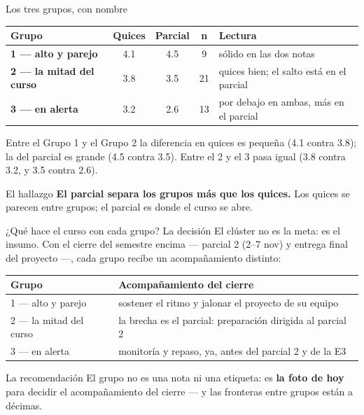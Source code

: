 \documentclass{beamer}
\begin{document}
\begin{frame}{Los tres grupos, con nombre}
\small
\begin{center}
\footnotesize
\setlength{\tabcolsep}{4pt}
\renewcommand{\arraystretch}{1.1}
\begin{tabular}{@{}l c c c l@{}}
\toprule
\textbf{Grupo} & \textbf{Quices} & \textbf{Parcial} & \textbf{n} & \textbf{Lectura} \\
\midrule
\textbf{1 --- alto y parejo} & 4.1 & 4.5 & 9 & sólido en las dos notas \\
\textbf{2 --- la mitad del curso} & 3.8 & 3.5 & 21 & quices bien; el salto está en el parcial \\
\textbf{3 --- en alerta} & 3.2 & 2.6 & 13 & por debajo en ambas, más en el parcial \\
\bottomrule
\end{tabular}
\end{center}

\vspace{0.2cm}
Entre el Grupo 1 y el Grupo 2 la diferencia en quices es pequeña (4.1 contra 3.8); la del parcial es grande (4.5 contra 3.5). Entre el 2 y el 3 pasa igual (3.8 contra 3.2, y 3.5 contra 2.6).

\vspace{0.1cm}
\begin{alertblock}{El hallazgo}
\textbf{El parcial separa los grupos más que los quices.} Los quices se parecen entre grupos; el parcial es donde el curso se abre.
\end{alertblock}
\end{frame}

\begin{frame}{¿Qué hace el curso con cada grupo? La decisión}
\small
El clúster no es la meta: es el insumo. Con el cierre del semestre encima --- parcial 2 (2--7 nov) y entrega final del proyecto ---, cada grupo recibe un acompañamiento distinto:

\vspace{0.15cm}
\begin{center}
\footnotesize
\setlength{\tabcolsep}{4pt}
\renewcommand{\arraystretch}{1.15}
\begin{tabular}{@{}l l@{}}
\toprule
\textbf{Grupo} & \textbf{Acompañamiento del cierre} \\
\midrule
1 --- alto y parejo & sostener el ritmo y jalonar el proyecto de su equipo \\
2 --- la mitad del curso & la brecha es el parcial: preparación dirigida al parcial 2 \\
3 --- en alerta & monitoría y repaso, ya, antes del parcial 2 y de la E3 \\
\bottomrule
\end{tabular}
\end{center}

\vspace{0.15cm}
\begin{alertblock}{La recomendación}
El grupo no es una nota ni una etiqueta: es \textbf{la foto de hoy} para decidir el acompañamiento del cierre --- y las fronteras entre grupos están a décimas.
\end{alertblock}
\end{frame}
\end{document}
